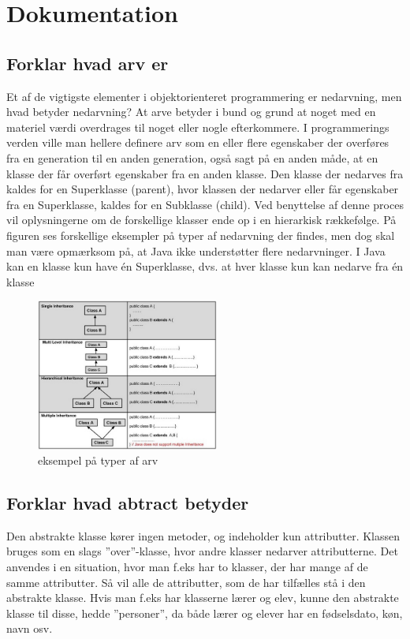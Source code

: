 \section{Dokumentation}
\subsection{Forklar hvad arv er}

Et af de vigtigste elementer i objektorienteret programmering er nedarvning, men hvad betyder nedarvning? At arve betyder i bund og grund at noget med en materiel værdi overdrages til noget eller nogle efterkommere. I programmerings verden ville man hellere definere arv som en eller flere egenskaber der overføres fra en generation til en anden generation, også sagt på en anden måde, at en klasse der får overført egenskaber fra en anden klasse. Den klasse der nedarves fra kaldes for en Superklasse (parent), hvor klassen der nedarver eller får egenskaber fra en Superklasse, kaldes for en Subklasse (child).
Ved benyttelse af denne proces vil oplysningerne om de forskellige klasser ende op i en hierarkisk rækkefølge. 
På figuren ses forskellige eksempler på typer af nedarvning der findes, men dog skal man være opmærksom på, at Java ikke understøtter flere nedarvninger. I Java kan en klasse kun have én Superklasse, dvs. at hver klasse kun kan nedarve fra én klasse

\begin{figure}[h]\label{fig:types_of_inheritance.jpg} 
    \advance\leftskip-3cm
    \includegraphics[width=6cm]{fig/types_of_inheritance.jpg}
    \caption{eksempel på typer af arv}
\end{figure}

\subsection{Forklar hvad abtract betyder}
Den abstrakte klasse kører ingen metoder, og indeholder kun attributter. Klassen bruges som en slags ”over”-klasse, hvor andre klasser nedarver attributterne. Det anvendes i en situation, hvor man f.eks har to klasser, der har mange af de samme attributter. Så vil alle de attributter, som de har tilfælles stå i den abstrakte klasse.
Hvis man f.eks har klasserne lærer og elev, kunne den abstrakte klasse til disse, hedde ”personer”, da både lærer og elever har en fødselsdato, køn, navn osv.

